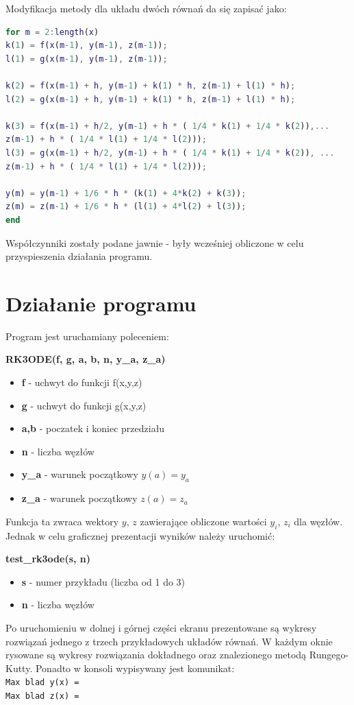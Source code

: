 \documentclass[]{article}
\begin{document}
Modyfikacja metody dla układu dwóch równań da się zapisać jako:
	\begin{lstlisting}[mathescape, language=Matlab]
for m = 2:length(x)
k(1) = f(x(m-1), y(m-1), z(m-1));
l(1) = g(x(m-1), y(m-1), z(m-1));

k(2) = f(x(m-1) + h, y(m-1) + k(1) * h, z(m-1) + l(1) * h);
l(2) = g(x(m-1) + h, y(m-1) + k(1) * h, z(m-1) + l(1) * h); 

k(3) = f(x(m-1) + h/2, y(m-1) + h * ( 1/4 * k(1) + 1/4 * k(2)),...
z(m-1) + h * ( 1/4 * l(1) + 1/4 * l(2)));   
l(3) = g(x(m-1) + h/2, y(m-1) + h * ( 1/4 * k(1) + 1/4 * k(2)), ...
z(m-1) + h * ( 1/4 * l(1) + 1/4 * l(2)));

y(m) = y(m-1) + 1/6 * h * (k(1) + 4*k(2) + k(3));
z(m) = z(m-1) + 1/6 * h * (l(1) + 4*l(2) + l(3));
end	
	\end{lstlisting}
Współczynniki zostały podane jawnie - były wcześniej obliczone w celu przyspieszenia działania programu.
\section{Działanie programu}
Program jest uruchamiany poleceniem:
\begin{center}
	\textbf{RK3ODE(f, g, a, b, n, y\_a, z\_a)}
\end{center} 
\begin{itemize}
	\item \textbf{f} - uchwyt do funkcji f(x,y,z)
	\item \textbf{g} - uchwyt do funkcji g(x,y,z)
	\item \textbf{a,b} - poczatek i koniec przedziału
	\item \textbf{n} - liczba węzłów
	\item \textbf{y\_a} - warunek początkowy $y(a) = y_a$
	\item \textbf{z\_a} - warunek początkowy $z(a) = z_a$
\end{itemize}
Funkcja ta zwraca wektory $y$, $z$ zawierające obliczone wartości $y_i$, $z_i$ dla węzłów. Jednak w celu graficznej prezentacji wyników należy uruchomić:
\begin{center}
	\textbf{test\_rk3ode(s, n)}
	\begin{itemize}
		\item \textbf{s} - numer przykładu (liczba od 1 do 3)
		\item \textbf{n} - liczba węzłów
	\end{itemize}
\end{center} 
Po uruchomieniu w dolnej i górnej części ekranu prezentowane są wykresy rozwiązań jednego z trzech przykładowych układów równań. W każdym oknie rysowane są wykresy rozwiązania dokładnego oraz znalezionego metodą Rungego-Kutty. Ponadto w konsoli wypisywany jest komunikat:\\
\verb|Max blad y(x) = |\\
\verb|Max blad z(x) = |
\end{document}
